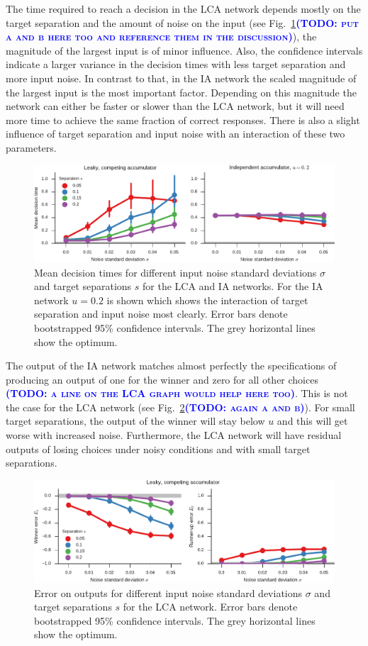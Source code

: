 \documentclass[10pt,letterpaper]{article}
\makeatletter
\newcommand{\todo}[1]{\textbf{\textsc{\textcolor{blue}{(TODO\@: #1)}}}}
\makeatother
\begin{document}
The time required to reach a decision in the LCA network depends mostly on the target separation and the amount of noise on the input (see Fig.~\ref{fig:time}\todo{put a and b here too and reference them in the discussion}), the magnitude of the largest input is of minor influence.
Also, the confidence intervals indicate a larger variance in the decision times with less target separation and more input noise.
In contrast to that, in the IA network the scaled magnitude of the largest input is the most important factor.
Depending on this magnitude the network can either be faster or slower than the LCA network, but it will need more time to achieve the same fraction of correct responses.
There is also a slight influence of target separation and input noise with an interaction of these two parameters.
\begin{figure}
    \centering
    \includegraphics{figures/time}
    \caption{
        Mean decision times for different input noise standard deviations $\sigma$ and target separations $s$ for the LCA and IA networks.
        For the IA network $u = 0.2$ is shown which shows the interaction of target separation and input noise most clearly.
        Error bars denote bootstrapped 95\% confidence intervals.
        The grey horizontal lines show the optimum.
    }\label{fig:time}
\end{figure}

The output of the IA network matches almost perfectly the specifications of producing an output of one for the winner and zero for all other choices \todo{a line on the LCA graph would help here too}.
This is not the case for the LCA network (see Fig.~\ref{fig:error}\todo{again a and b}).
For small target separations, the output of the winner will stay below $u$ and this will get worse with increased noise.
Furthermore, the LCA network will have residual outputs of losing choices under noisy conditions and with small target separations.
\begin{figure}
    \centering
    \includegraphics{figures/error}
    \caption{
        Error on outputs for different input noise standard deviations $\sigma$ and target separations $s$ for the LCA network.
        Error bars denote bootstrapped 95\% confidence intervals.
        The grey horizontal lines show the optimum.
    }\label{fig:error}
\end{figure}
\end{document}
